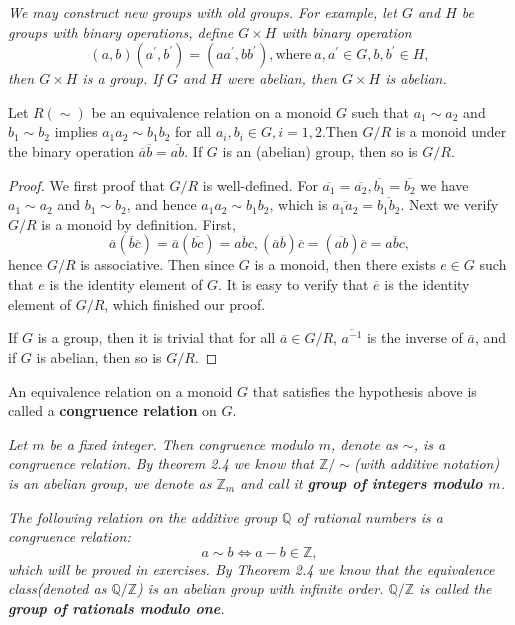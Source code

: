 \begin{example}\em
We may construct new groups with old groups. For example, let $G$ and $H$ be groups with binary operations, define $G\times H$ with binary operation
$$(a,b)(a^\prime,b^\prime)=(aa^\prime,bb^\prime),\text{where}\ a,a^\prime\in G,b,b^\prime\in H,$$
then $G\times H$ is a group. If $G$ and $H$ were abelian, then $G\times H$ is abelian.
\end{example}
\begin{theorem}
Let $R(\sim)$ be an equivalence relation on a monoid $G$ such that $a_1\sim a_2$ and $b_1\sim b_2$ implies $a_1a_2\sim b_1b_2$ for all $a_i,b_i\in G,i=1,2$.Then $G/R$ is a monoid under the binary operation $\overline{a}\overline{b}=\overline{ab}$. If $G$ is an (abelian) group, then so is $G/R$.
\end{theorem}
\begin{proof}
We first proof that $G/R$ is well-defined. For $\overline{a_1}=\overline{a_2},\overline{b_1}=\overline{b_2}$ we have $a_1\sim a_2$ and $b_1\sim b_2$, and hence $a_1a_2\sim b_1b_2$, which is $\overline{a_1a_2}=\overline{b_1b_2}$. Next we verify $G/R$ is a monoid by definition. First,
$$
\overline{a}\left( \overline{b}\overline{c} \right) =\overline{a}\left( \overline{bc} \right) =\overline{abc},\left( \overline{a}\overline{b} \right) \overline{c}=\left( \overline{ab} \right) \overline{c}=\overline{abc},
$$
hence $G/R$ is associative. Then since $G$ is a monoid, then there exists $e\in G$ such that $e$ is the identity element of $G$. It is easy to verify that $\overline{e}$ is the identity element of $G/R$, which finished our proof.\par
If $G$ is a group, then it is trivial that for all $\overline{a}\in G/R$, $\overline{a^{-1}}$ is the inverse of $\overline{a}$, and if $G$ is abelian, then so is $G/R$.
\end{proof}
An equivalence relation on a monoid $G$ that satisfies the hypothesis above is called a \textbf{congruence relation} on $G$.
\begin{example}\em
Let $m$ be a fixed integer. Then congruence modulo $m$, denote as $\sim$, is a congruence relation. By theorem 2.4 we know that $\mathbb{Z}/\sim$(with additive notation) is an abelian group, we denote as $\mathbb{Z}_m$ and call it \textbf{group of integers modulo $m$}.
\end{example}
\begin{example}\em
The following relation on the additive group $\mathbb{Q}$ of rational numbers is a congruence relation:
$$a\sim b\Leftrightarrow a-b\in\mathbb{Z},$$
which will be proved in exercises. By Theorem 2.4 we know that the equivalence class(denoted as $\mathbb{Q}/\mathbb{Z}$) is an abelian group with infinite order. $\mathbb{Q}/\mathbb{Z}$ is called the \textbf{group of rationals modulo one}.
\end{example}
